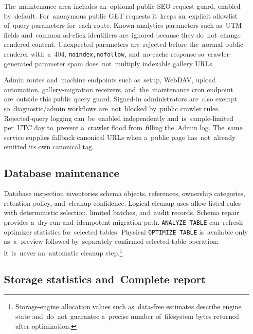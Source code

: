 \documentclass[11pt,a4paper]{article}
\newcommand{\codeword}[1]{\nolinkurl{#1}}
\begin{document}
The~maintenance area includes an~optional public SEO request guard, enabled
by~default. For~anonymous public GET requests it~keeps an~explicit allowlist
of~query parameters for~each route. Known analytics parameters such as~UTM
fields and~common ad-click identifiers are~ignored because they do~not~change
rendered content. Unexpected parameters are~rejected before the~normal public
renderer with~a~404, \codeword{noindex,nofollow}, and~no-cache response
so~crawler-generated parameter spam does~not~multiply indexable gallery URLs.

Admin routes and~machine endpoints such as~setup, WebDAV, upload automation,
gallery-migration receivers, and~the~maintenance cron endpoint are~outside this
public query guard. Signed-in administrators are~also exempt so~diagnostic/admin
workflows are~not~blocked by~public crawler rules. Rejected-query logging
can~be~enabled independently and~is~sample-limited per~UTC day to~prevent
a~crawler flood from~filling the~Admin log. The~same service supplies fallback
canonical URLs when a~public page has~not~already emitted its own canonical tag.

\subsection{Database maintenance}

Database inspection inventories schema objects, references, ownership
categories, retention policy, and~cleanup confidence. Logical cleanup uses
allow-listed rules with deterministic selection, limited batches, and~audit
records. Schema repair provides a~dry-run and~idempotent migration path.
\codeword{ANALYZE TABLE} can~refresh optimizer statistics for~selected tables.
Physical \codeword{OPTIMIZE TABLE} is~available only as~a~preview followed
by~separately confirmed selected-table operation; it~is~never an~automatic
cleanup step.\footnote{Storage-engine allocation values such as~data-free
estimates describe engine state and~do~not~guarantee a~precise number
of~filesystem bytes returned after optimization.}

\subsection{Storage statistics and~Complete report}
\end{document}
